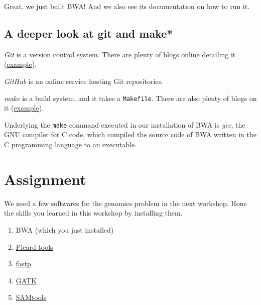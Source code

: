 \documentclass[12pt,letterpaper]{article}
\begin{document}
Great, we just built BWA! And we also see its documentation on how to run it.

\subsection{A deeper look at git and make*}

\textit{Git} is a version control system. There are plenty of blogs online detailing it (\href{https://webtuu.com/blog/04/a-laymans-introduction-to-git}{example}).

\textit{GitHub} is an online service hosting Git repositories.

\textit{make} is a build system, and it takes a \texttt{Makefile}. There are also plenty of blogs on it (\href{https://matt.might.net/articles/intro-to-make/}{example}).

Underlying the \texttt{make} command executed in our installation of BWA is \textit{gcc}, the GNU compiler for C code, which compiled the source code of BWA written in the C programming language to an executable.

\section{Assignment}

We need a few softwares for the genomics problem in the next workshop. Hone the skills you learned in this workshop by installing them.

\begin{enumerate}
   \item BWA (which you just installed)
   \item \href{https://broadinstitute.github.io/picard/}{Picard tools}
   \item \href{https://github.com/OpenGene/fastp}{fastp}
   \item \href{https://github.com/broadinstitute/gatk}{GATK}
   \item \href{http://www.htslib.org/download/}{SAMtools}
\end{enumerate}
\end{document}
